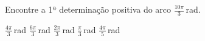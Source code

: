 Encontre a 1ª determinação positiva do arco $\frac{10\pi}{3}$\,rad.

$\frac{4\pi}{3}$\,rad
$\frac{6\pi}{3}$\,rad
$\frac{2\pi}{3}$\,rad
$\frac{\pi}{3}$\,rad
$\frac{4\pi}{5}$\,rad



